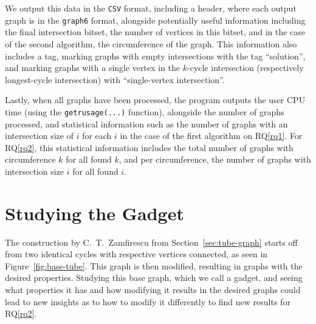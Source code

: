 We output this data in the \texttt{CSV} format, including a header, where each output graph is in the \texttt{graph6} format, alongside potentially useful information including the final intersection bitset, the number of vertices in this bitset, and in the case of the second algorithm, the circumference of the graph. This information also includes a tag, marking graphs with empty intersections with the tag ``solution'', and marking graphs with a single vertex in the $k$-cycle intersection (respectively longest-cycle intersection) with ``single-vertex intersection''.

Lastly, when all graphs have been processed, the program outputs the user CPU time (using the \texttt{getrusage(...)} function), alongside the number of graphs processed, and statistical information such as the number of graphs with an intersection size of $i$ for each $i$ in the case of the first algorithm on RQ\ref{rq1}. For RQ\ref{rq2}, this statistical information includes the total number of graphs with circumference $k$ for all found $k$, and per circumference, the number of graphs with intersection size $i$ for all found $i$.

\section{Studying the Gadget}
\label{sec:gadget}

The construction by C.\ T.\ Zamfirescu from Section~\ref{sec:tube-graph} starts off from two identical cycles with respective vertices connected, as seen in Figure~\ref{fig:base-tube}. This graph is then modified, resulting in graphs with the desired properties. Studying this base graph, which we call a gadget, and seeing what properties it has and how modifying it results in the desired graphs could lead to new insights as to how to modify it differently to find new results for RQ\ref{rq2}.

